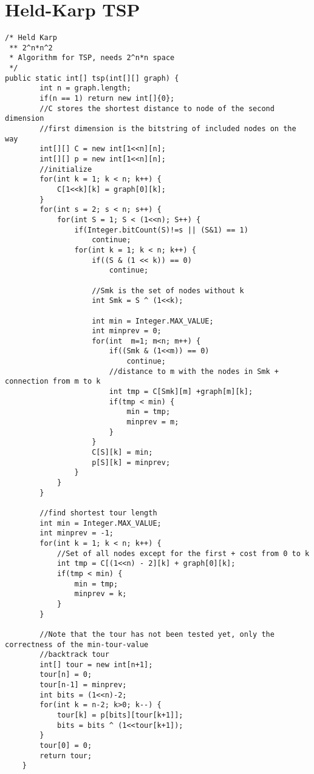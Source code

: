 \documentclass[10pt,a4paper]{article}
\begin{document}
\section{Held-Karp TSP}
\begin{lstlisting}
/* Held Karp
 ** 2^n*n^2
 * Algorithm for TSP, needs 2^n*n space 
 */
public static int[] tsp(int[][] graph) {
        int n = graph.length;
        if(n == 1) return new int[]{0};
        //C stores the shortest distance to node of the second dimension
        //first dimension is the bitstring of included nodes on the way
        int[][] C = new int[1<<n][n];
        int[][] p = new int[1<<n][n];
        //initialize
        for(int k = 1; k < n; k++) {
            C[1<<k][k] = graph[0][k];
        }
        for(int s = 2; s < n; s++) {
            for(int S = 1; S < (1<<n); S++) {
                if(Integer.bitCount(S)!=s || (S&1) == 1)
                    continue;
                for(int k = 1; k < n; k++) {
                    if((S & (1 << k)) == 0)
                        continue;
                    
                    //Smk is the set of nodes without k
                    int Smk = S ^ (1<<k);
                    
                    int min = Integer.MAX_VALUE;
                    int minprev = 0;
                    for(int  m=1; m<n; m++) {
                        if((Smk & (1<<m)) == 0)
                            continue;
                        //distance to m with the nodes in Smk + connection from m to k
                        int tmp = C[Smk][m] +graph[m][k];
                        if(tmp < min) {
                            min = tmp;
                            minprev = m;
                        }
                    }
                    C[S][k] = min;
                    p[S][k] = minprev;
                }
            }
        }
        
        //find shortest tour length
        int min = Integer.MAX_VALUE;
        int minprev = -1;
        for(int k = 1; k < n; k++) {
            //Set of all nodes except for the first + cost from 0 to k
            int tmp = C[(1<<n) - 2][k] + graph[0][k];
            if(tmp < min) {
                min = tmp;
                minprev = k;
            }
        }
        
        //Note that the tour has not been tested yet, only the correctness of the min-tour-value
        //backtrack tour
        int[] tour = new int[n+1];
        tour[n] = 0;
        tour[n-1] = minprev;
        int bits = (1<<n)-2;
        for(int k = n-2; k>0; k--) {
            tour[k] = p[bits][tour[k+1]];
            bits = bits ^ (1<<tour[k+1]);
        }
        tour[0] = 0;
        return tour;
    }
\end{lstlisting}
\end{document}
